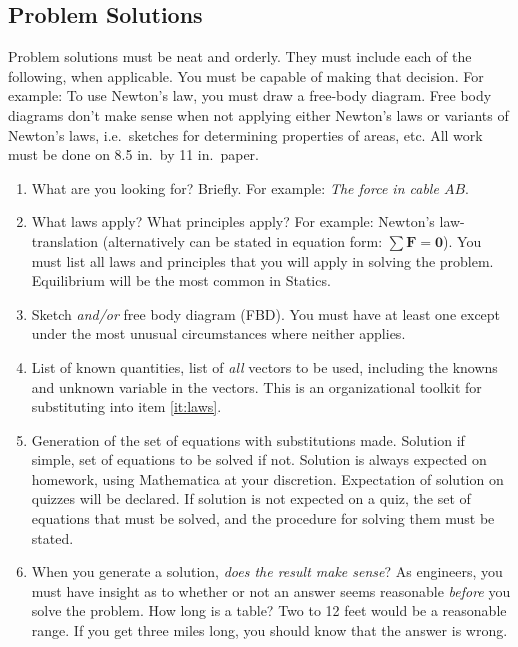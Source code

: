 \documentclass[10pt]{article}
\begin{document}
\subsection*{Problem Solutions}
Problem solutions must be neat and orderly.  They must include each of the following, when applicable.  You must be capable of making that decision.  For example: To use Newton's law, you must draw a free-body diagram.  Free body diagrams don't make sense when not applying either Newton's laws or variants of Newton's laws, i.e.~sketches for determining properties of areas, etc. All work must be done on 8.5 in.~by 11 in.~paper.
\begin{enumerate}
        \item What are you looking for?  Briefly.  For example: \emph{The force in
        cable $AB$}.

        \item \label{it:laws} What laws apply?  What principles apply?  For
        example: Newton's law-translation (alternatively can be stated in
        equation form: $\sum{\mathbf{F}}=\mathbf{0}$).  You must list all laws
        and principles that you will apply in solving the problem. 
        Equilibrium will be the most common in Statics.

        \item Sketch \emph{and/or} free body diagram (FBD).  You must have at
        least one except under the most unusual circumstances where neither applies.

        \item List of known quantities, list of \emph{all} vectors to be used,
        including the knowns and unknown variable in the vectors.  This is an
        organizational toolkit for substituting into item \ref{it:laws}.

        \item Generation of the set of equations with substitutions made. 
        Solution if simple, set of equations to be solved if not.  Solution is
        always expected on homework, using Mathematica at your discretion. 
        Expectation of solution on quizzes will be declared.  If solution is
        not expected on a quiz, the set of equations that must be solved, and
        the procedure for solving them must be stated.

        \item When you generate a solution, \emph{does the result make sense}? 
        As engineers, you must have insight as to whether or not an answer
        seems reasonable \emph{before} you solve the problem.  How long is a
        table?  Two to 12 feet would be a reasonable range.  If you get three
        miles long, you should know that the answer is wrong.
\end{enumerate}
\end{document}

